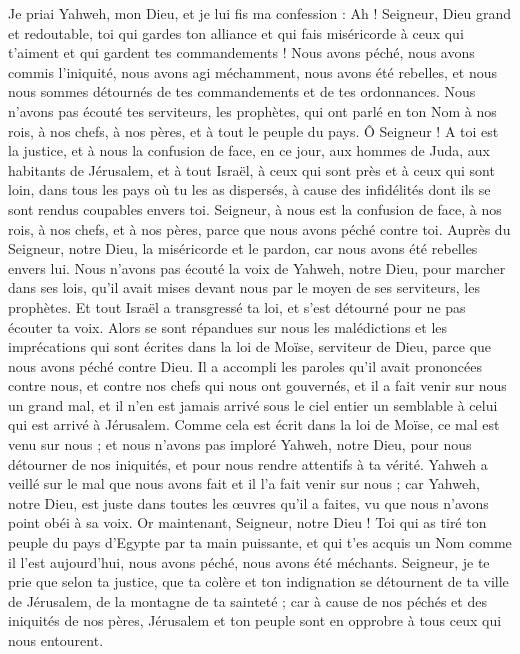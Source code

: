 \begin{multicols}{2}
Je priai Yahweh, mon Dieu, et je lui fis ma confession : Ah ! Seigneur, Dieu grand et redoutable, toi qui gardes ton alliance et qui fais miséricorde à ceux qui t'aiment et qui gardent tes commandements !
Nous avons péché, nous avons commis l'iniquité, nous avons agi méchamment, nous avons été rebelles, et nous nous sommes détournés de tes commandements et de tes ordonnances.
Nous n'avons pas écouté tes serviteurs, les prophètes, qui ont parlé en ton Nom à nos rois, à nos chefs, à nos pères, et à tout le peuple du pays.
Ô Seigneur ! A toi est la justice, et à nous la confusion de face, en ce jour, aux hommes de Juda, aux habitants de Jérusalem, et à tout Israël, à ceux qui sont près et à ceux qui sont loin, dans tous les pays où tu les as dispersés, à cause des infidélités dont ils se sont rendus coupables envers toi.
Seigneur, à nous est la confusion de face, à nos rois, à nos chefs, et à nos pères, parce que nous avons péché contre toi.
Auprès du Seigneur, notre Dieu, la miséricorde et le pardon, car nous avons été rebelles envers lui.
Nous n'avons pas écouté la voix de Yahweh, notre Dieu, pour marcher dans ses lois, qu'il avait mises devant nous par le moyen de ses serviteurs, les prophètes.
Et tout Israël a transgressé ta loi, et s'est détourné pour ne pas écouter ta voix. Alors se sont répandues sur nous les malédictions et les imprécations qui sont écrites dans la loi de Moïse, serviteur de Dieu, parce que nous avons péché contre Dieu.
Il a accompli les paroles qu'il avait prononcées contre nous, et contre nos chefs qui nous ont gouvernés, et il a fait venir sur nous un grand mal, et il n'en est jamais arrivé sous le ciel entier un semblable à celui qui est arrivé à Jérusalem.
Comme cela est écrit dans la loi de Moïse, ce mal est venu sur nous ; et nous n'avons pas imploré Yahweh, notre Dieu, pour nous détourner de nos iniquités, et pour nous rendre attentifs à ta vérité.
Yahweh a veillé sur le mal que nous avons fait et il l'a fait venir sur nous ; car Yahweh, notre Dieu, est juste dans toutes les œuvres qu'il a faites, vu que nous n'avons point obéi à sa voix.
Or maintenant, Seigneur, notre Dieu ! Toi qui as tiré ton peuple du pays d'Egypte par ta main puissante, et qui t'es acquis un Nom comme il l'est aujourd'hui, nous avons péché, nous avons été méchants.
Seigneur, je te prie que selon ta justice, que ta colère et ton indignation se détournent de ta ville de Jérusalem, de la montagne de ta sainteté ; car à cause de nos péchés et des iniquités de nos pères, Jérusalem et ton peuple sont en opprobre à tous ceux qui nous entourent.

\end{multicols}
